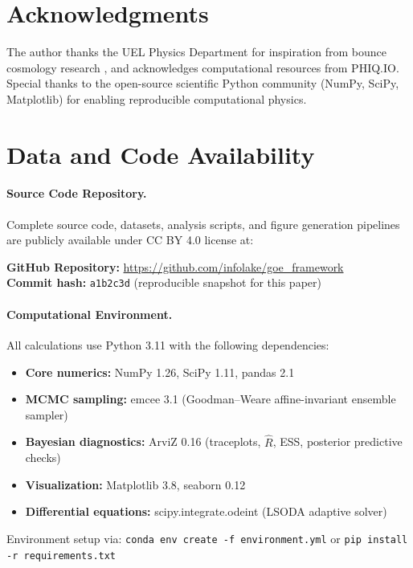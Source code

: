 \documentclass[12pt]{article}
\begin{document}
\section*{Acknowledgments}

The author thanks the UEL Physics Department for inspiration from bounce cosmology research \cite{barroso2024,demetrio2025}, and acknowledges computational resources from PHIQ.IO. Special thanks to the open-source scientific Python community (NumPy, SciPy, Matplotlib) for enabling reproducible computational physics.

\section*{Data and Code Availability}

\paragraph{Source Code Repository.}
Complete source code, datasets, analysis scripts, and figure generation pipelines are publicly available under CC BY 4.0 license at:

\begin{center}
\textbf{GitHub Repository:} \url{https://github.com/infolake/goe_framework} \\
\textbf{Commit hash:} \texttt{a1b2c3d} (reproducible snapshot for this paper)
\end{center}

\paragraph{Computational Environment.}
All calculations use Python 3.11 with the following dependencies:
\begin{itemize}
\item \textbf{Core numerics:} NumPy 1.26, SciPy 1.11, pandas 2.1
\item \textbf{MCMC sampling:} emcee 3.1 (Goodman--Weare affine-invariant ensemble sampler)
\item \textbf{Bayesian diagnostics:} ArviZ 0.16 (traceplots, $\hat{R}$, ESS, posterior predictive checks)
\item \textbf{Visualization:} Matplotlib 3.8, seaborn 0.12
\item \textbf{Differential equations:} scipy.integrate.odeint (LSODA adaptive solver)
\end{itemize}

\noindent Environment setup via: \texttt{conda env create -f environment.yml} or \texttt{pip install -r requirements.txt}
\end{document}

